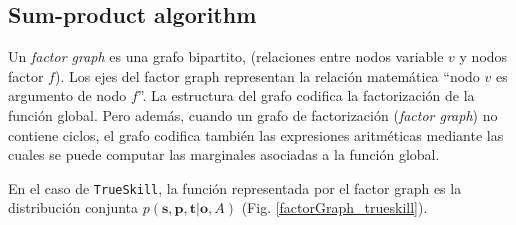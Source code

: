\documentclass[article]{jss}
\begin{document}
\subsection{Sum-product algorithm}

Un \emph{factor graph} es una grafo bipartito, (relaciones entre nodos variable $v$ y nodos factor $f$).
Los ejes del factor graph representan la relaci\'on matem\'atica ``nodo $v$ es argumento de nodo $f$''.
La estructura del grafo codifica la factorizaci\'on de la funci\'on global.
Pero adem\'as, cuando un grafo de factorizaci\'on (\emph{factor graph}) no contiene ciclos, el grafo codifica tambi\'en las expresiones aritm\'eticas mediante las cuales se puede computar las marginales asociadas a la funci\'on global.

En el caso de \texttt{TrueSkill},
la funci\'on representada por el factor graph es la distribuci\'on 
conjunta $p(\bm{s},\bm{p},\bm{t}|\bm{o},A)$ (Fig.
\ref{factorGraph_trueskill}). 
\end{document}
